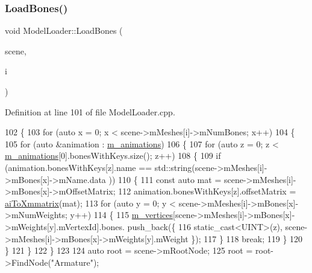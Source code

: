 \subsubsection{\texorpdfstring{Load\+Bones()}{LoadBones()}}
{\footnotesize\ttfamily void Model\+Loader\+::\+Load\+Bones (\begin{DoxyParamCaption}\item[{const ai\+Scene $\ast$}]{scene,  }\item[{const int}]{i }\end{DoxyParamCaption})\hspace{0.3cm}{\ttfamily [private]}}



Definition at line 101 of file Model\+Loader.\+cpp.


\begin{DoxyCode}
102 \{
103     \textcolor{keywordflow}{for} (\textcolor{keyword}{auto} x = 0; x < scene->mMeshes[i]->mNumBones; x++)
104     \{
105         \textcolor{keywordflow}{for} (\textcolor{keyword}{auto} &animation : \mbox{\hyperlink{class_model_loader_a2b9cf4d8fe3432ddc656651057c78860}{m\_animations}})
106         \{
107             \textcolor{keywordflow}{for} (\textcolor{keyword}{auto} z = 0; z < \mbox{\hyperlink{class_model_loader_a2b9cf4d8fe3432ddc656651057c78860}{m\_animations}}[0].bonesWithKeys.size(); z++)
108             \{
109                 \textcolor{keywordflow}{if} (animation.bonesWithKeys[z].name == std::string(scene->mMeshes[i]->mBones[x]->mName.data
      ))
110                 \{
111                     \textcolor{keyword}{const} \textcolor{keyword}{auto} mat = scene->mMeshes[i]->mBones[x]->mOffsetMatrix;
112                     animation.bonesWithKeys[z].offsetMatrix = \mbox{\hyperlink{class_model_loader_ab142e176c572ea327518f01fb2f0630b}{aiToXmmatrix}}(mat);
113                     \textcolor{keywordflow}{for} (\textcolor{keyword}{auto} y = 0; y < scene->mMeshes[i]->mBones[x]->mNumWeights; y++)
114                     \{
115                         \mbox{\hyperlink{class_model_loader_ac87b9662dae9c00b140bc90c30c088ee}{m\_vertices}}[scene->mMeshes[i]->mBones[x]->mWeights[y].mVertexId].bones.
      push\_back(\{
116                             \textcolor{keyword}{static\_cast<}UINT\textcolor{keyword}{>}(z), scene->mMeshes[i]->mBones[x]->mWeights[y].mWeight \});
117                     \}
118                     \textcolor{keywordflow}{break};
119                 \}
120             \}
121         \}
122     \}
123 
124     \textcolor{keyword}{auto} root = scene->mRootNode;
125     root = root->FindNode(\textcolor{stringliteral}{"Armature"});

\end{DoxyCode}
